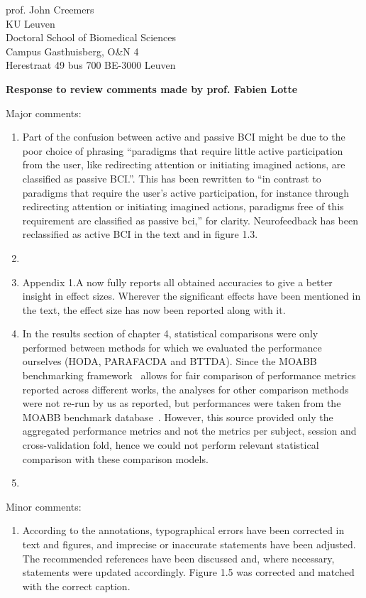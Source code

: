 \documentclass{letter}
\newcommand{\reply}[1]{%
	\textbf{Response to review comments made by prof. #1}

}
\begin{document}
\begin{letter}{
	prof. John Creemers \\
	KU Leuven \\
	Doctoral School of Biomedical Sciences \\
	Campus Gasthuisberg, O\&N 4 \\
	Herestraat 49 bus 700
	BE-3000 Leuven

}
\reply{Fabien Lotte}
Major comments:
\begin{enumerate}
	\item Part of the confusion between active and passive BCI might be due
	to the poor choice of phrasing ``paradigms that require little active
  participation from the user, like redirecting attention or initiating imagined actions, are classified as passive BCI.''.
	This has been rewritten to ``in contrast to paradigms that require the user's active participation, for
	instance through redirecting attention or initiating imagined actions,
	paradigms free of this requirement are classified as passive bci,''
	for clarity.
	Neurofeedback has been reclassified as active BCI in the text and in
	figure 1.3.
	\item {}
  \item Appendix 1.A now fully reports all obtained accuracies to give a better
    insight in effect sizes. Wherever the significant effects have been mentioned
    in the text, the effect size has now been reported along with it.
	\item In the results section of chapter 4, statistical comparisons were
	only performed between methods for which we evaluated the performance
	ourselves (HODA, PARAFACDA and BTTDA).
	Since the MOABB benchmarking framework~\cite{Aristimunha2023} allows for
	fair comparison of performance metrics reported across different works,
	the analyses for other comparison methods were not re-run
	by us as reported, but performances were
	taken from the MOABB benchmark database~\cite{Chevallier2024}.
	However, this source provided only the aggregated performance metrics
	and not the metrics per subject, session and cross-validation fold,
	hence we could not perform relevant statistical comparison with these
	comparison models.
	\item {}
\end{enumerate}
Minor comments:
\begin{enumerate}
	\item According to the annotations, typographical errors have been
	corrected in text and figures, and imprecise or inaccurate statements have been adjusted.
	The recommended references have been discussed and, where necessary,
	statements were updated accordingly.
  Figure 1.5 was corrected and matched with the correct caption.
\end{enumerate}


\end{letter}
\end{document}
